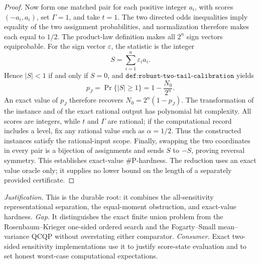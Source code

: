 \documentclass{article}
\begin{document}
\begin{proof}
Now form one matched pair for each positive integer \(a_i\), with scores \((-a_i,a_i)\), set \(\Gamma=1\), and take \(t=1\). The two directed odds inequalities imply equality of the two assignment probabilities, and normalization therefore makes each equal to \(1/2\). The product-law definition makes all \(2^n\) sign vectors equiprobable. For the sign vector \(\varepsilon\), the statistic is the integer
\[
S=\sum_{i=1}^n\varepsilon_i a_i.
\]
Hence \(\lvert S\rvert<1\) if and only if \(S=0\), and \(\texttt{def:robust-two-tail-calibration}\) yields
\[
p_J=\Pr\{\lvert S\rvert\ge1\}
 =1-\frac{N_0}{2^n}.
\]
An exact value of \(p_J\) therefore recovers \(N_0=2^n(1-p_J)\). The transformation of the instance and of the exact rational output has polynomial bit complexity. All scores are integers, while \(t\) and \(\Gamma\) are rational; if the computational record includes a level, fix any rational value such as \(\alpha=1/2\). Thus the constructed instances satisfy the rational-input scope. Finally, swapping the two coordinates in every pair is a bijection of assignments and sends \(S\) to \(-S\), proving reversal symmetry. This establishes exact-value \(\#\mathrm P\)-hardness. The reduction uses an exact value oracle only; it supplies no lower bound on the length of a separately provided certificate.
\end{proof}
\par\smallskip\noindent \textit{Justification.} This is the durable root: it combines the all-sensitivity representational separation, the equal-moment obstruction, and exact-value hardness. \textit{Gap.} It distinguishes the exact finite union problem from the Rosenbaum--Krieger one-sided ordered search and the Fogarty--Small mean--variance QCQP without overstating either comparator. \textit{Consumer.} Exact two-sided sensitivity implementations use it to justify score-state evaluation and to set honest worst-case computational expectations.
\end{document}
